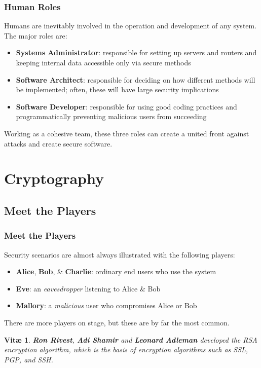\documentclass[aspectratio=169]{beamer}
\newtheorem{vita}{Vit\ae}
\begin{document}
\begin{frame}
\frametitle{Human Roles}
Humans are inevitably involved in the operation and development of any system. The major roles are:
\begin{itemize}
	\item \textbf{Systems Administrator}: responsible for setting up servers and routers and keeping internal data accessible only via secure methods
	\item \textbf{Software Architect}: responsible for deciding on how different methods will be implemented; often, these will have large security implications
	\item \textbf{Software Developer}: responsible for using good coding practices and programmatically preventing malicious users from succeeding
\end{itemize}
Working as a cohesive team, these three roles can create a united front against attacks and create secure software.
\end{frame}

\section{Cryptography}
\subsection{Meet the Players}
\begin{frame}
\frametitle{Meet the Players}
Security scenarios are almost always illustrated with the following players:
\begin{itemize}
	\item \textbf{Alice}, \textbf{Bob}, \& \textbf{Charlie}: ordinary end users who use the system
	\item \textbf{Eve}: an \emph{eavesdropper} listening to Alice \& Bob
	\item \textbf{Mallory}: a \emph{malicious} user who compromises Alice or Bob
\end{itemize}

There are more players on stage, but these are by far the most common.
\pause
\begin{vita}
\textbf{Ron Rivest}, \textbf{Adi Shamir} and \textbf{Leonard Adleman} developed the RSA encryption algorithm, which is the basis of encryption algorithms such as SSL, PGP, and SSH.
\end{vita}
\end{frame}
\end{document}
